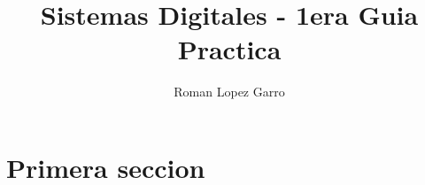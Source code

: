 \documentclass[12pt]{article}
\title{Sistemas Digitales - 1era Guia Practica}
\author{Roman Lopez Garro}
\begin{document}
\maketitle


\section{Primera seccion}
\end{document}
